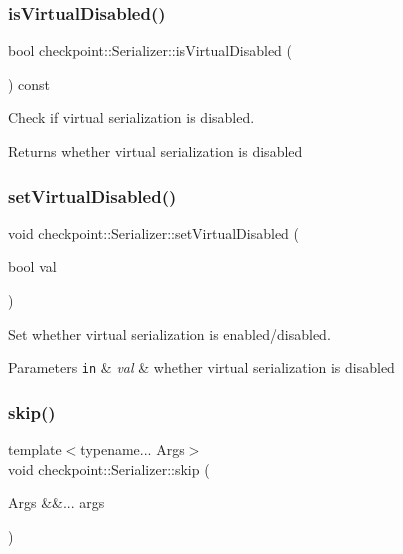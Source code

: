 \subsubsection{\texorpdfstring{is\+Virtual\+Disabled()}{isVirtualDisabled()}}
{\footnotesize\ttfamily bool checkpoint\+::\+Serializer\+::is\+Virtual\+Disabled (\begin{DoxyParamCaption}{ }\end{DoxyParamCaption}) const\hspace{0.3cm}{\ttfamily [inline]}}



Check if virtual serialization is disabled. 

\begin{DoxyReturn}{Returns}
whether virtual serialization is disabled 
\end{DoxyReturn}
\mbox{\label{structcheckpoint_1_1_serializer_af57d7cd51e94dd44a5be184456c2d59f}} 
\subsubsection{\texorpdfstring{set\+Virtual\+Disabled()}{setVirtualDisabled()}}
{\footnotesize\ttfamily void checkpoint\+::\+Serializer\+::set\+Virtual\+Disabled (\begin{DoxyParamCaption}\item[{bool}]{val }\end{DoxyParamCaption})\hspace{0.3cm}{\ttfamily [inline]}}



Set whether virtual serialization is enabled/disabled. 


\begin{DoxyParams}[1]{Parameters}
\mbox{\tt in}  & {\em val} & whether virtual serialization is disabled \\
\hline
\end{DoxyParams}
\mbox{\label{structcheckpoint_1_1_serializer_ae0224c5bad49a1bd2af178987adb84f9}} 
\subsubsection{\texorpdfstring{skip()}{skip()}}
{\footnotesize\ttfamily template$<$typename... Args$>$ \\
void checkpoint\+::\+Serializer\+::skip (\begin{DoxyParamCaption}\item[{Args \&\&...}]{args }\end{DoxyParamCaption})\hspace{0.3cm}{\ttfamily [inline]}}



